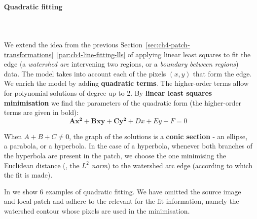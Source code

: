 \paragraph{Quadratic fitting}\mbox{}\\\mbox{}\\
\label{par:ch4-quadratic-lls-fitting}
We extend the idea from the previous Section~\ref*{sec:ch4-patch-transformations}~\ref{par:ch4-line-fitting-lls} of applying linear least squares to fit the edge (a {\it watershed arc} intervening two regions, or a {\it boundary between regions}) data. The model takes into account each of the pixels $(x,y)$ that form the edge. We enrich %
the model by adding {\bf quadratic terms}. The higher-order terms allow for polynomial solutions of degree up to 2. By {\bf linear least squares minimisation} we find the parameters of the quadratic form (the higher-order terms are given in bold): %
\begin{equation}
 \mathbf{Ax^2+Bxy+Cy^2}+Dx+Ey+F=0
\end{equation}

When $A + B + C \ne 0$, the graph of the solutions is a \textbf{conic section} - an ellipse, a parabola, or a hyperbola. In the case of a hyperbola, whenever both branches of the hyperbola are present in the patch, we choose the one minimising the Euclidean distance (\ie, the {\it $L^2$ norm}) to the watershed arc edge (according to which the fit is made).

In  we show 6 examples of quadratic fitting. We have omitted the source image %
and local patch and adhere to %
the relevant for the fit information, namely the watershed contour whose pixels are used in the minimisation.

